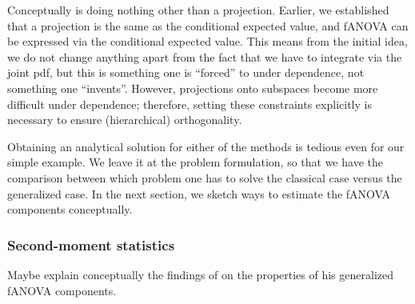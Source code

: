 Conceptually \cite{hooker2007} is doing nothing other than a projection. Earlier, we established that a projection is the same as the conditional expected value, and fANOVA can be expressed via the conditional expected value. This means from the initial idea, we do not change anything apart from the fact that we have to integrate via the joint pdf, but this is something one is ``forced'' to under dependence, not something one ``invents''. However, projections onto subspaces become more difficult under dependence; therefore, setting these constraints explicitly is necessary to ensure (hierarchical) orthogonality.\par
Obtaining an analytical solution for either of the methods is tedious even for our simple example. We leave it at the problem formulation, so that we have the comparison between which problem one has to solve the classical case versus the generalized case. In the next section, we sketch ways to estimate the fANOVA components conceptually.



\subsubsection*{Second-moment statistics}
Maybe explain conceptually the findings of \cite{rahman2014} on the properties of his generalized fANOVA components.


